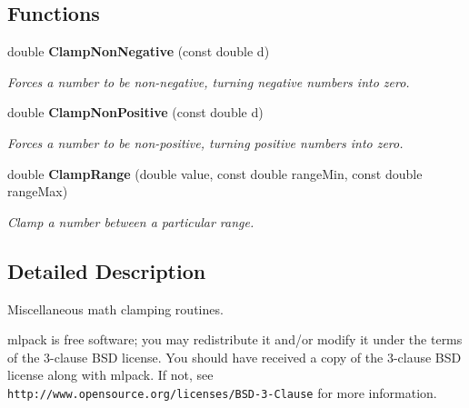 \subsection*{Functions}
\begin{DoxyCompactItemize}
\item 
double \textbf{ Clamp\+Non\+Negative} (const double d)
\begin{DoxyCompactList}\small\item\em Forces a number to be non-\/negative, turning negative numbers into zero. \end{DoxyCompactList}\item 
double \textbf{ Clamp\+Non\+Positive} (const double d)
\begin{DoxyCompactList}\small\item\em Forces a number to be non-\/positive, turning positive numbers into zero. \end{DoxyCompactList}\item 
double \textbf{ Clamp\+Range} (double value, const double range\+Min, const double range\+Max)
\begin{DoxyCompactList}\small\item\em Clamp a number between a particular range. \end{DoxyCompactList}\end{DoxyCompactItemize}


\subsection{Detailed Description}
Miscellaneous math clamping routines. 

mlpack is free software; you may redistribute it and/or modify it under the terms of the 3-\/clause B\+SD license. You should have received a copy of the 3-\/clause B\+SD license along with mlpack. If not, see {\tt http\+://www.\+opensource.\+org/licenses/\+B\+S\+D-\/3-\/\+Clause} for more information. 